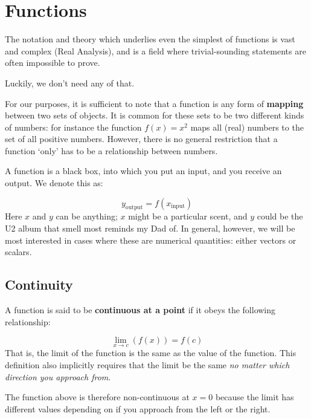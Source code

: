 \documentclass[a4paper,openany,11pt]{book}
\begin{document}
			\section{Functions}

				The notation and theory which underlies even the simplest of functions is vast and complex (Real Analysis), and is a field where trivial-sounding statements are often impossible to prove. 
				
				Luckily, we don't need any of that. 

				For our purposes, it is sufficient to note that a function is any form of \textbf{mapping} between two sets of objects. It is common for these sets to be two different kinds of numbers: for instance the function $f(x) = x^2$ maps all (real) numbers to the set of all positive numbers. However, there is no general restriction that a function `only' has to be a relationship between numbers. 

				A function is a black box, into which you put an input, and you receive an output. We denote this as:

				\begin{equation}
					y_\text{output} = f(x_\text{input})
				\end{equation}
				Here $x$ and $y$ can be anything; $x$ might be a particular scent, and $y$ could be the U2 album that smell most reminds my Dad of. In general, however, we will be most interested in cases where these are numerical quantities: either vectors or scalars. 



				\subsection{Continuity}

					A function is said to be \textbf{continuous at a point} if it obeys the following relationship:

					\begin{equation}
						\lim_{x \to c}\left(f(x)\right)  = f(c)
					\end{equation}
					That is, the limit of the function is the same as the value of the function. This definition also implicitly requires that the limit be the same \textit{no matter which direction you approach from}.

					\begin{center}
						\end{center}
					The function above is therefore non-continuous at $x = 0$ because the limit has different values depending on if you approach from the left or the right. 
\end{document}
